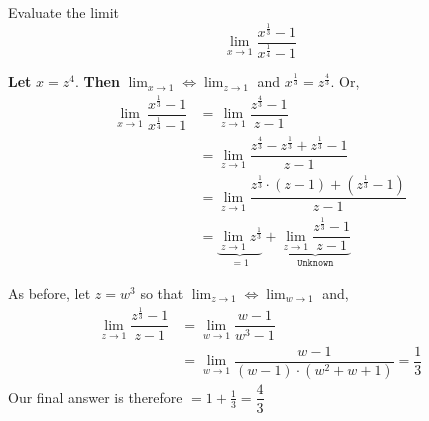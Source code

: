 

\question Evaluate the limit \[ \lim_{x\to 1}\dfrac{x^{\frac{1}{3}}-1}{x^{\frac{1}{4}}-1}\]

\begin{solution}
  \textbf{Let} $x = z^4$. \textbf{Then} $\lim_{x\to 1} \Longleftrightarrow \lim_{z\to 1}$ and $x^{\frac{1}{3}} = z^{\frac{4}{3}}$. Or, 
  \begin{align}
    \lim_{x\to 1}\dfrac{x^{\frac{1}{3}} - 1}{x^{\frac{1}{4}} - 1} &= 
    \lim_{z\to 1}\dfrac{z^{\frac{4}{3}} - 1}{z - 1} \\
    &=\lim_{z\to 1}\dfrac{z^{\frac{4}{3}} - z^{\frac{1}{3}} + z^{\frac{1}{3}} - 1}{z - 1} \\
    &= \lim_{z\to 1}\dfrac{z^{\frac{1}{3}}\cdot (z-1) + (z^{\frac{1}{3}} - 1)}{z-1} \\
    &= \underbrace{\lim_{z\to 1}z^{\frac{1}{3}}}_{= 1} + 
    \underbrace{\lim_{z\to 1}\dfrac{z^{\frac{1}{3}} - 1}{z-1}}_{\texttt{Unknown}}
  \end{align}
  
  As before, let $z = w^3$ so that $\lim_{z\to 1}\Longleftrightarrow\lim_{w\to 1}$ and, 
  \begin{align}
    \lim_{z\to 1}\dfrac{z^{\frac{1}{3}}-1}{z-1} &= \lim_{w\to 1}\dfrac{w-1}{w^3-1} \\
    &= \lim_{w\to 1}\dfrac{w-1}{(w-1)\cdot (w^2+w+1)} = \dfrac{1}{3}
  \end{align}
  Our final answer is therefore $= 1+\frac{1}{3} = \dfrac{4}{3}$
\end{solution}
